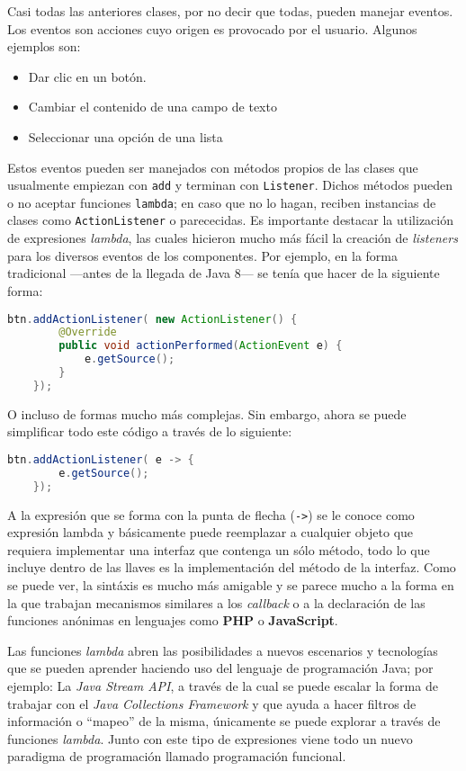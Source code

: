 Casi todas las anteriores clases, por no decir que todas, pueden manejar eventos. Los eventos son acciones cuyo origen es provocado
por el usuario. Algunos ejemplos son:

\begin{itemize}
    \item Dar clic en un botón.
    \item Cambiar el contenido de una campo de texto
    \item Seleccionar una opción de una lista
\end{itemize}

Estos eventos pueden ser manejados con métodos propios de las clases que usualmente empiezan con \texttt{add} y terminan con
\texttt{Listener}. Dichos métodos pueden o no aceptar funciones \texttt{lambda}; en caso que no lo hagan, reciben instancias de clases
como \texttt{ActionListener} o parececidas. Es importante destacar la utilización de expresiones \textit{lambda}, las cuales hicieron 
mucho más fácil la creación de \textit{listeners} para los diversos eventos de los componentes. Por ejemplo, en la forma tradicional 
---antes de la llegada de Java 8--- se tenía que hacer de la siguiente forma:

\begin{lstlisting}[language=Java]
    btn.addActionListener( new ActionListener() {
        @Override
        public void actionPerformed(ActionEvent e) {
            e.getSource();
        }
    });
\end{lstlisting}

O incluso de formas mucho más complejas. Sin embargo, ahora se puede simplificar todo este código a través de lo siguiente:

\begin{lstlisting}[language=Java]
    btn.addActionListener( e -> {
        e.getSource();
    });
\end{lstlisting}

A la expresión que se forma con la punta de flecha (\texttt{->}) se le conoce como expresión lambda y básicamente puede 
reemplazar a cualquier objeto que requiera implementar una interfaz que contenga un sólo método, todo lo que incluye dentro 
de las llaves es la implementación del método de la interfaz. Como se puede ver, la sintáxis es mucho más amigable y se parece 
mucho a la forma en la que trabajan mecanismos similares a los \textit{callback} o a la declaración de las funciones anónimas 
en lenguajes como \textbf{PHP} o \textbf{JavaScript}.

Las funciones \textit{lambda} abren las posibilidades a nuevos escenarios y tecnologías que se pueden aprender haciendo uso del 
lenguaje de programación Java; por ejemplo: La \textit{Java Stream API}, a través de la cual se puede escalar la forma de trabajar 
con el \textit{Java Collections Framework} y que ayuda a hacer filtros de información o ``mapeo'' de la misma, únicamente se puede 
explorar a través de funciones \textit{lambda}. Junto con este tipo de expresiones viene todo un nuevo paradigma de programación llamado 
programación funcional.

